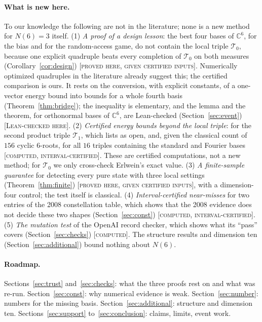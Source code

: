 \documentclass[11pt]{article}
\newcommand{\C}{\mathbb{C}}
\newcommand{\Tz}{\mathcal{T}_0}          %
\newcommand{\To}{\mathcal{T}_1}          %
\newcommand{\st}[1]{\textsc{[#1]}}
\newcommand{\stleanA}{\st{Lean-checked here}}
\newcommand{\stgiven}{\st{proved here, given certified inputs}}
\newcommand{\stcert}{\st{computed, interval-certified}}
\newcommand{\stcomp}{\st{computed}}
\theoremstyle{definition}
\theoremstyle{remark}
\begin{document}
\paragraph{What is new here.} To our knowledge the following are not in the literature; none is a new method for
$N(6)=3$ itself.
(1) \emph{A proof of a design lesson}: the best four bases of $\C^6$, for the bias and for the random-access game, do
not contain the local triple $\Tz$, because one explicit quadruple beats every completion of $\Tz$ on both measures
(Corollary~\ref{cor:design}) \stgiven. Numerically optimized quadruples in the literature \cite{RLE,MWreview} already
suggest this; the certified comparison is ours. It rests on the conversion, with explicit constants, of a one-vector energy
bound into bounds for a whole fourth basis (Theorem~\ref{thm:bridge}); the inequality is elementary, and the lemma and
the theorem, for orthonormal bases of $\C^6$, are Lean-checked (Section~\ref{sec:event}) \stleanA.
(2) \emph{Certified energy bounds beyond the local triple}: for the second product triple $\To$, which
\cite{Erlwein} lists as open, and, given the classical count of $156$ cyclic $6$-roots, for all $16$ triples
containing the standard and Fourier bases \stcert. These are certified computations, not a new method; for $\Tz$
we only cross-check Erlwein's exact value.
(3) \emph{A finite-sample guarantee} for detecting every pure state with three local settings
(Theorem~\ref{thm:finite}) \stgiven, with a dimension-four control; the test itself is classical.
(4) \emph{Interval-certified near-misses} for two entries of the 2008 constellation table, which shows that the 2008
evidence does not decide these two shapes (Section~\ref{sec:const}) \stcert.
(5) \emph{The mutation test} of the OpenAI record checker, which shows what its ``pass'' covers
(Section~\ref{sec:checks}) \stcomp. The structure results and dimension ten
(Section~\ref{sec:additional}) bound nothing about $N(6)$.

\paragraph{Roadmap.} Sections~\ref{sec:trust} and~\ref{sec:checks}: what the three proofs rest on and what was re-run.
Section~\ref{sec:const}: why numerical evidence is weak. Section~\ref{sec:number}: numbers for the missing basis.
Section~\ref{sec:additional}: structure and dimension ten. Sections~\ref{sec:support} to~\ref{sec:conclusion}: claims, limits, event work.

\end{document}
